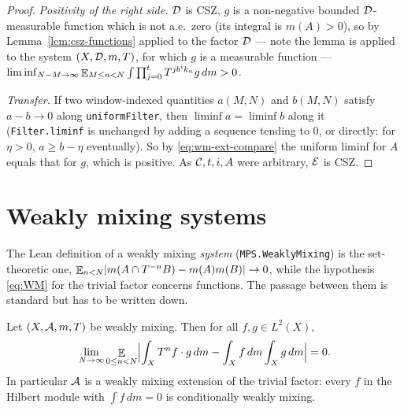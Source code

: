 \begin{proof}
  \emph{Positivity of the right side.}  $\mathcal{D}$ is CSZ, $g$ is a non-negative bounded
  $\mathcal{D}$-measurable function which is not a.e.\ zero (its integral is $m(A) > 0$), so by
  Lemma~\ref{lem:csz-functions} applied to the factor $\mathcal{D}$ --- note the lemma is applied to
  the system $(X,\mathcal{D},m,T)$, for which $g$ is a measurable function ---
  $\liminf_{N-M \to \infty} \mathop{\mathbb{E}}_{M \leq n < N} \int \prod_{j=0}^{t} T^{jb^ik_n} g\,dm > 0$.

  \emph{Transfer.}  If two window-indexed quantities $a(M,N)$ and $b(M,N)$ satisfy
  $a - b \to 0$ along \texttt{uniformFilter}, then $\liminf a = \liminf b$ along it
  (\texttt{Filter.liminf} is unchanged by adding a sequence tending to $0$, or directly: for
  $\eta > 0$, $a \geq b - \eta$ eventually).  So by \eqref{eq:wm-ext-compare} the uniform
  liminf for $A$ equals that for $g$, which is positive.  As $\mathcal{C}, t, i, A$ were arbitrary,
  $\mathcal{E}$ is CSZ.
\end{proof}

\section{Weakly mixing systems}

The Lean definition of a weakly mixing \emph{system} (\texttt{MPS.WeaklyMixing}) is the
set-theoretic one, $\mathop{\mathbb{E}}_{n<N} \lvert m(A \cap T^{-n}B) - m(A)m(B) \rvert \to 0$, while the hypothesis
\eqref{eq:WM} for the trivial factor concerns functions.  The passage between them is
standard but has to be written down.

\begin{lemma}
  \label{lem:wm-sets-to-functions}
  \leanok
  Let $(X,\mathcal{A},m,T)$ be weakly mixing.  Then for all $f, g \in L^2(X)$,
  \begin{equation}
    \label{eq:wm-functions}
    \lim_{N\to\infty} \mathop{\mathbb{E}}_{0 \leq n < N} \Bigl\lvert \int_X T^n f \cdot g \,dm - \int_X f\,dm \int_X g\,dm \Bigr\rvert = 0 .
  \end{equation}
  In particular $\mathcal{A}$ is a weakly mixing extension of the trivial factor: every $f$ in the
  Hilbert module with $\int f\,dm = 0$ is conditionally weakly mixing.
\end{lemma}

